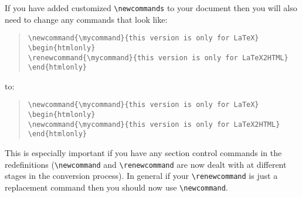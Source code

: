 \documentclass[twoside,11pt]{article}
\renewcommand{\_}{\texttt{\symbol{95}}}
\begin{document}
If you have added customized \verb#\newcommands# to your document then
you will also need to change any commands that look like:
\begin{quote}
\verb!\newcommand{\mycommand}{this version is only for LaTeX}!\\
\verb!\begin!\verb!{htmlonly}!\\
\enspace\enspace\hspace*{2em}\verb!\renewcommand{\mycommand}{this version is only for LaTeX2HTML}!\\
\verb!\end!\verb!{htmlonly}!
\end{quote}
to:
\begin{quote}
\verb!\newcommand{\mycommand}{this version is only for LaTeX}!\\
\verb!\begin!\verb!{htmlonly}!\\
\enspace\enspace\hspace*{2em}\verb!\newcommand{\mycommand}{this version is only for LaTeX2HTML}!\\
\verb!\end!\verb!{htmlonly}!
\end{quote}
This is especially important if you have any section control commands
in the redefinitions (\verb#\newcommand# and \verb#\renewcommand# are
now dealt with at different stages in the conversion process). In
general if your \verb#\renewcommand# is just a replacement command then
you should now use \verb#\newcommand#.
\end{document}
